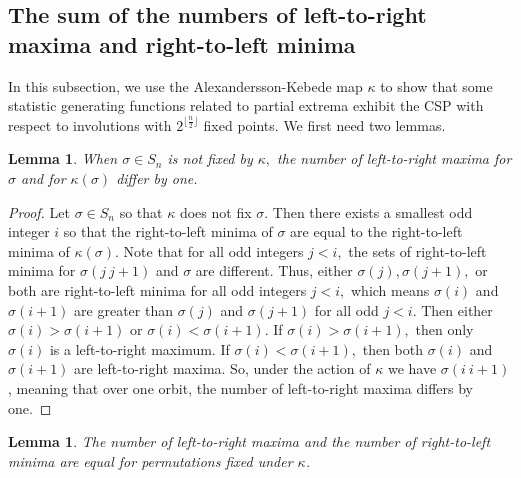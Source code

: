 \documentclass{amsart}
\newtheorem{lem}[thm]{Lemma}
\theoremstyle{definition}
\begin{document}
\subsection{The sum of the numbers of left-to-right maxima and right-to-left minima}
\label{subsec:ak_l2r}
In this subsection, we use the Alexandersson-Kebede map $\kappa$ to show that some statistic generating functions related to partial extrema exhibit the CSP with respect to involutions with $2^{\lfloor\frac{n}{2}\rfloor}$ fixed points. %
We first need two lemmas.

\begin{lem}\label{lem:L2Rmax-non_fixed_points}
  When $\sigma\in S_n$ is not fixed by $\kappa,$ the number of left-to-right maxima for $\sigma$ and for $\kappa(\sigma)$ differ by one.
\end{lem}

\begin{proof}
  Let $\sigma\in S_n$ so that $\kappa$ does not fix $\sigma.$ Then there exists a smallest odd integer $i$ so that the right-to-left minima of $\sigma$ are equal to the right-to-left minima of $\kappa(\sigma).$ Note that for all odd integers $j<i,$ the sets of right-to-left minima for $\sigma(j~j+1)$ and $\sigma$ are different. Thus, either $\sigma(j),\sigma(j+1),$ or both are right-to-left minima for all odd integers $j<i,$ which means $\sigma(i)$ and $\sigma(i+1)$ are greater than $\sigma(j)$ and $\sigma(j+1)$ for all odd $j<i.$
  Then either $\sigma(i)>\sigma(i+1)$ or $\sigma(i)<\sigma(i+1).$ If $\sigma(i)>\sigma(i+1),$ then only $\sigma(i)$ is a left-to-right maximum. If $\sigma(i)<\sigma(i+1),$ then both $\sigma(i)$ and $\sigma(i+1)$ are left-to-right maxima. So, under the action of $\kappa$ we have $\sigma(i~i+1)$, meaning that over one orbit, the number of left-to-right maxima differs by one.
\end{proof}

\begin{lem}\label{lem:R2Lmin=L2Rmax_fixed_points}
  The number of left-to-right maxima and the number of right-to-left minima are equal for permutations fixed under $\kappa$.
\end{lem}
\end{document}
